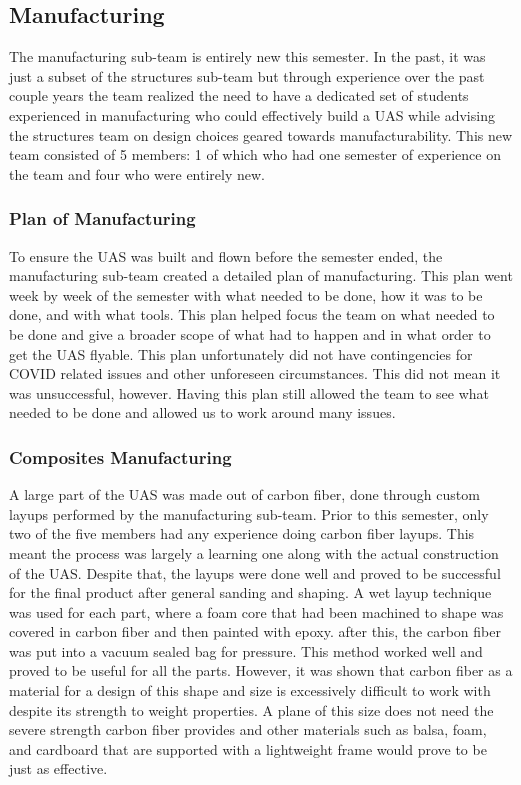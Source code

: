 \documentclass{article}
\begin{document}
\subsection{Manufacturing}

The manufacturing sub-team is entirely new this semester. In the past, it was just a subset of the structures sub-team but through experience over the past couple years the team realized the need to have a dedicated set of students experienced in manufacturing who could effectively build a UAS while advising the structures team on design choices geared towards manufacturability. This new team consisted of 5 members: 1 of which who had one semester of experience on the team and four who were entirely new.

\subsubsection{Plan of Manufacturing}
To ensure the UAS was built and flown before the semester ended, the manufacturing sub-team created a detailed plan of manufacturing. This plan went week by week of the semester with what needed to be done, how it was to be done, and with what tools. This plan helped focus the team on what needed to be done and give a broader scope of what had to happen and in what order to get the UAS flyable. This plan unfortunately did not have contingencies for COVID related issues and other unforeseen circumstances. This did not mean it was unsuccessful, however. Having this plan still allowed the team to see what needed to be done and allowed us to work around many issues.

\subsubsection{Composites Manufacturing}
A large part of the UAS was made out of carbon fiber, done through custom layups performed by the manufacturing sub-team. Prior to this semester, only two of the five members had any experience doing carbon fiber layups. This meant the process was largely a learning one along with the actual construction of the UAS. Despite that, the layups were done well and proved to be successful for the final product after general sanding and shaping. A wet layup technique was used for each part, where a foam core that had been machined to shape was covered in carbon fiber and then painted with epoxy. after this, the carbon fiber was put into a vacuum sealed bag for pressure. This method worked well and proved to be useful for all the parts. However, it was shown that carbon fiber as a material for a design of this shape and size is excessively difficult to work with despite its strength to weight properties. A plane of this size does not need the severe strength carbon fiber provides and other materials such as balsa, foam, and cardboard that are supported with a lightweight frame would prove to be just as effective.
\end{document}
